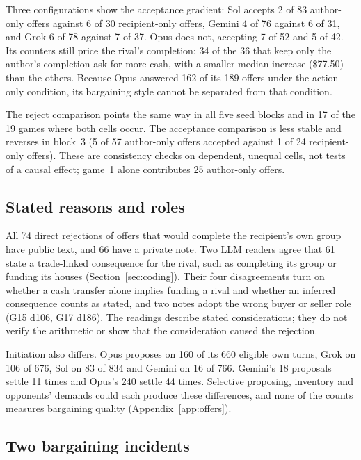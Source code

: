 Three configurations show the acceptance gradient: Sol accepts 2 of 83 author-only offers against 6 of 30 recipient-only offers, Gemini 4 of 76 against 6 of 31, and Grok 6 of 78 against 7 of 37. Opus does not, accepting 7 of 52 and 5 of 42. Its counters still price the rival's completion: 34 of the 36 that keep only the author's completion ask for more cash, with a smaller median increase (\$77.50) than the others. Because Opus answered 162 of its 189 offers under the action-only condition, its bargaining style cannot be separated from that condition.

The reject comparison points the same way in all five seed blocks and in 17 of the 19 games where both cells occur. The acceptance comparison is less stable and reverses in block~3 (5 of 57 author-only offers accepted against 1 of 24 recipient-only offers). These are consistency checks on dependent, unequal cells, not tests of a causal effect; game~1 alone contributes 25 author-only offers.

\subsection{Stated reasons and roles}

All 74 direct rejections of offers that would complete the recipient's own group have public text, and 66 have a private note. Two LLM readers agree that 61 state a trade-linked consequence for the rival, such as completing its group or funding its houses (Section~\ref{sec:coding}). Their four disagreements turn on whether a cash transfer alone implies funding a rival and whether an inferred consequence counts as stated, and two notes adopt the wrong buyer or seller role (G15 d106, G17 d186). The readings describe stated considerations; they do not verify the arithmetic or show that the consideration caused the rejection.

Initiation also differs. Opus proposes on 160 of its 660 eligible own turns, Grok on 106 of 676, Sol on 83 of 834 and Gemini on 16 of 766. Gemini's 18 proposals settle 11 times and Opus's 240 settle 44 times. Selective proposing, inventory and opponents' demands could each produce these differences, and none of the counts measures bargaining quality (Appendix~\ref{app:offers}).

\subsection{Two bargaining incidents}

